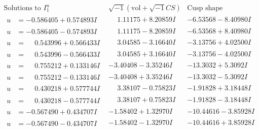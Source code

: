 \documentclass[1p]{elsarticle_modified}
\theoremstyle{definition}
\newcommand{\I}{\sqrt{-1}}
\begin{document}
$$\begin{array}{c|c|c}  
\text{Solutions to }I^u_{1}& \I (\text{vol} + \sqrt{-1}CS) & \text{Cusp shape}\\
 \hline 
\begin{aligned}
u &= -0.586405 + 0.574893 I\end{aligned}
 & \phantom{-}1.11175 + 8.20859 I & -6.53568 - 8.40980 I \\ \hline\begin{aligned}
u &= -0.586405 - 0.574893 I\end{aligned}
 & \phantom{-}1.11175 - 8.20859 I & -6.53568 + 8.40980 I \\ \hline\begin{aligned}
u &= \phantom{-}0.543996 + 0.566433 I\end{aligned}
 & \phantom{-}3.04585 - 3.16640 I & -3.13756 + 4.02500 I \\ \hline\begin{aligned}
u &= \phantom{-}0.543996 - 0.566433 I\end{aligned}
 & \phantom{-}3.04585 + 3.16640 I & -3.13756 - 4.02500 I \\ \hline\begin{aligned}
u &= \phantom{-}0.755212 + 0.133146 I\end{aligned}
 & -3.40408 - 3.35246 I & -13.3032 + 5.3092 I \\ \hline\begin{aligned}
u &= \phantom{-}0.755212 - 0.133146 I\end{aligned}
 & -3.40408 + 3.35246 I & -13.3032 - 5.3092 I \\ \hline\begin{aligned}
u &= \phantom{-}0.430218 + 0.577744 I\end{aligned}
 & \phantom{-}3.38107 - 0.75823 I & -1.91828 + 3.18448 I \\ \hline\begin{aligned}
u &= \phantom{-}0.430218 - 0.577744 I\end{aligned}
 & \phantom{-}3.38107 + 0.75823 I & -1.91828 - 3.18448 I \\ \hline\begin{aligned}
u &= -0.567490 + 0.434707 I\end{aligned}
 & -1.58402 + 1.32970 I & -10.44616 - 3.85928 I \\ \hline\begin{aligned}
u &= -0.567490 - 0.434707 I\end{aligned}
 & -1.58402 - 1.32970 I & -10.44616 + 3.85928 I \\ \hline\begin{aligned}

\end{aligned}
\end{array}$$
\end{document}
